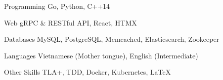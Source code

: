 


\begin{cvskills}


\cvskill
{Programming} %
{Go, Python, C++14} %


\cvskill
{Web} %
{gRPC \& RESTful API, React, HTMX} %

\cvskill
{Databases} %
{MySQL, PostgreSQL, Memcached, Elasticsearch, Zookeeper} %


\cvskill
{Languages} %
{Vietnamese (Mother tongue), English (Intermediate)} %


\cvskill
{Other Skills} %
{TLA+, TDD, Docker, Kubernetes, LaTeX}%


\end{cvskills}
